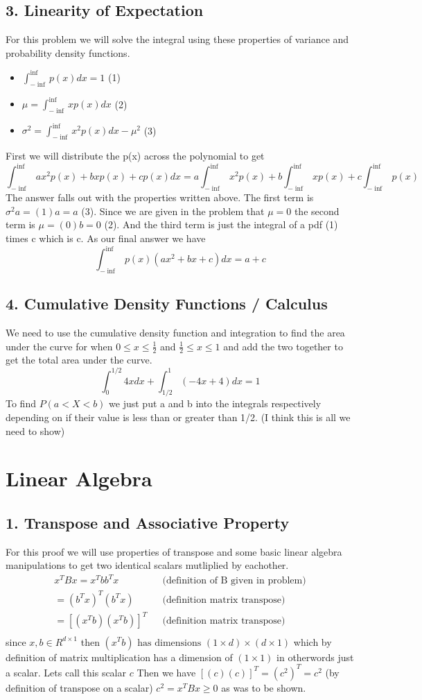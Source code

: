 \documentclass{article}
\begin{document}
\pagebreak
\subsection*{3. Linearity of Expectation}
For this problem we will solve the integral using these properties of variance and probability density functions. 
\begin{itemize}
  \item[] $ \int_{-\inf}^{\inf} p(x) dx = 1$ (1)
  \item[] $ \mu = \int_{-\inf}^{\inf} xp(x) dx$ (2)
  \item[] ${\sigma}^2 = \int_{-\inf}^{\inf} x^2p(x) dx - \mu^2 $ (3) 
\end{itemize}
First we will distribute the p(x) across the polynomial to get \[\int_{-\inf}^{\inf}ax^2p(x)+bxp(x)+cp(x) dx = a\int_{-\inf}^{\inf}x^2p(x) + b\int_{-\inf}^{\inf}xp(x) + c\int_{-\inf}^{\inf}p(x) \]
The answer falls out with the properties written above. The first term is $\sigma^2a = (1)a = a$ (3). Since we are given in the problem that $\mu=0$  the second term is $\mu = (0)b = 0$ (2). And the third term is just the integral of a pdf (1) times c which is c. As our final answer we have \[\int_{-\inf}^{\inf} p(x)(ax^2+bx+c) dx = a+c\]

\subsection*{4. Cumulative Density Functions / Calculus}
We need to use the cumulative density function and integration to find the area under the curve for when $0\leq x \leq \frac{1}{2}$ and $\frac{1}{2} \leq x \leq 1$ and add the two together to get the total area under the curve. \[\int_{0}^{1/2}4x dx + \int_{1/2}^{1}(-4x+4)dx = 1\] 
To find $P(a<X<b)$ we just put a and b into the integrals respectively depending on if their value is less than or greater than 1/2.
 (I think this is all we need to show)

\section*{Linear Algebra}
\subsection*{1. Transpose and Associative Property}
For this proof we will use properties of transpose and some basic linear algebra manipulations to get two identical scalars mutliplied by eachother.
\begin{align*}
  x^TBx = x^Tbb^Tx && \text{(definition of B given in problem)} \\
  =(b^Tx)^T(b^Tx) && \text{(definition matrix transpose)} \\
  =[(x^Tb)(x^Tb)]^T && \text{(definition matrix transpose)} \\
\end{align*}
since $x,b \in R^{d\times1}$ then $(x^Tb) \text{ has dimensions } (1 \times d)\times(d \times 1)$ which by definition of matrix multiplication has a dimension of $(1 \times 1)$ in otherwords just a scalar. Lets call this scalar $c$ Then we have $[(c)(c)]^T = (c^2)^T = c^2$ (by definition of transpose on a scalar) $c^2 = x^TBx \geq 0$ as was to be shown. 
\end{document}
